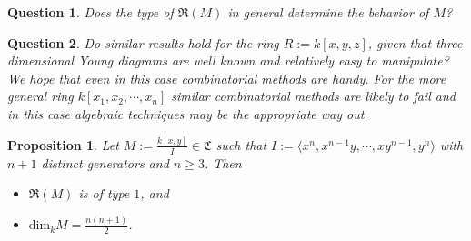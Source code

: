 \documentclass[12pt,a4paper]{article}
\newtheorem{que}{Question}[section]
\newtheorem{prop}{Proposition}[section]
\begin{document}
		\begin{que}
\normalfont
 Does the type of $\mathfrak{R}(M)$ in general determine the behavior of $M$?
		\end{que}
		\begin{que}
			\normalfont
			Do similar results hold for the ring $R:=k[x, y, z]$, given that three dimensional Young diagrams are well known and relatively easy to manipulate? We hope that even in this case combinatorial methods are handy. For the more general ring $k[x_1, x_2, \cdots,x_n]$ similar combinatorial methods are likely to fail and in this case algebraic techniques may be the appropriate way out.
		\end{que}
		\begin{prop}
			\normalfont
			Let $M:=\frac{k[x,y]}{I}\in\mathfrak{C}$ such that $I:=\langle x^n, x^{n-1}y, \cdots, xy^{n-1}, y^n \rangle$ with $n+1$ distinct generators and $n\geq 3$. Then
			\begin{itemize}
				\item [1.] $\mathfrak{R}(M)$ is of type $1$, and
				\item [2.] $\text{dim}_kM=\frac{n(n+1)}{2}$.
			\end{itemize}
		\end{prop}
\end{document}
